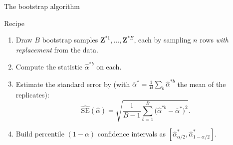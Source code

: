 \documentclass[aspectratio=169,11pt]{beamer}
\begin{document}
\begin{frame}{The bootstrap algorithm}
  \begin{block}{Recipe}
    \begin{enumerate}
      \item Draw $B$ bootstrap samples
            $\mathbf{Z}^{*1}, \ldots, \mathbf{Z}^{*B}$, each by
            sampling $n$ rows \emph{with replacement} from the data.
      \item Compute the statistic $\hat\alpha^{*b}$ on each.
      \item Estimate the standard error by (with $\bar\alpha^*=\tfrac1B\sum_b\hat\alpha^{*b}$ the mean of the replicates):
            \[
              \widehat{\mathrm{SE}}(\hat\alpha) =
              \sqrt{\frac{1}{B-1}\sum_{b=1}^B
                \bigl(\hat\alpha^{*b} - \bar\alpha^*\bigr)^2}.
            \]
      \item Build percentile $(1 - \alpha)$ confidence intervals as
            $[\hat\alpha^*_{\alpha/2}, \hat\alpha^*_{1-\alpha/2}]$.
    \end{enumerate}
  \end{block}
\end{frame}
\end{document}
